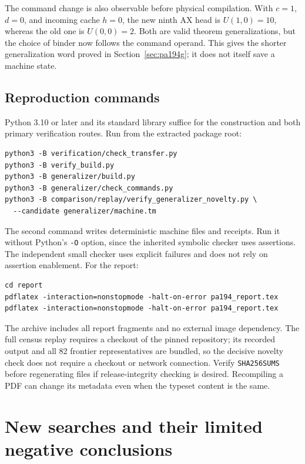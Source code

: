 \documentclass[11pt]{article}
\newcommand{\file}[1]{\nolinkurl{#1}}
\begin{document}
The command change is also observable before physical compilation. With
$c=1$, $d=0$, and incoming cache $h=0$, the new ninth AX head is
$U(1,0)=10$, whereas the old one is $U(0,0)=2$. Both are valid theorem
generalizations, but the choice of binder now follows the command operand.
This gives the shorter generalization word proved in
Section~\ref{sec:pa194g}; it does not itself save a machine state.

\subsection{Reproduction commands}
Python 3.10 or later and its standard library suffice for the construction
and both primary verification routes. Run from the extracted package root:
\begin{verbatim}
python3 -B verification/check_transfer.py
python3 -B verify_build.py
python3 -B generalizer/build.py
python3 -B generalizer/check_commands.py
python3 -B comparison/replay/verify_generalizer_novelty.py \
  --candidate generalizer/machine.tm
\end{verbatim}
The second command writes deterministic machine files and receipts. Run it
without Python's \texttt{-O} option, since the inherited symbolic checker
uses assertions. The independent small checker uses explicit failures and
does not rely on assertion enablement. For the report:
\begin{verbatim}
cd report
pdflatex -interaction=nonstopmode -halt-on-error pa194_report.tex
pdflatex -interaction=nonstopmode -halt-on-error pa194_report.tex
\end{verbatim}
The archive includes all report fragments and no external image dependency.
The full census replay requires a checkout of the pinned repository; its
recorded output and all 82 frontier representatives are bundled, so the
decisive novelty check does not require a checkout or network connection.
Verify \file{SHA256SUMS} before regenerating files if release-integrity
checking is desired. Recompiling a PDF can change its metadata even when
the typeset content is the same.

\section{New searches and their limited negative conclusions}
\label{sec:search}

\end{document}
